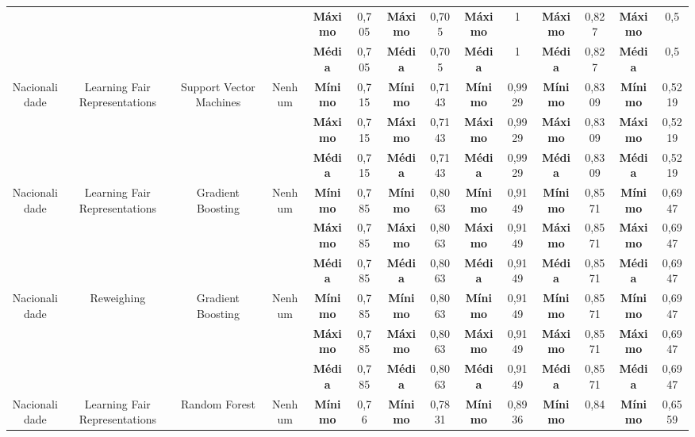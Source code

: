 \documentclass[portugues]{ic-tese}
\begin{document}
\begin{table}[H]
\begin{center}
{\begin{tabular}{c|c|c|c|c|c|c|c|c|c|c|c|c|c}
             & & & & \textbf{Máximo} & 0,705 & \textbf{Máximo} & 0,705 & \textbf{Máximo} & 1 & \textbf{Máximo} & 0,827 & \textbf{Máximo} & 0,5 \\
             & & & & \textbf{Média} & 0,705 & \textbf{Média} & 0,705 & \textbf{Média} & 1 & \textbf{Média} & 0,827 & \textbf{Média} & 0,5 \\
            \hline
            \multirow{3}{*}{Nacionalidade} & \multirow{3}{*}{Learning Fair Representations} & \multirow{3}{*}{Support Vector Machines} & \multirow{3}{*}{Nenhum} & \textbf{Mínimo} & 0,715 & \textbf{Mínimo} & 0,7143 & \textbf{Mínimo} & 0,9929 & \textbf{Mínimo} & 0,8309 & \textbf{Mínimo} & 0,5219 \\
             & & & & \textbf{Máximo} & 0,715 & \textbf{Máximo} & 0,7143 & \textbf{Máximo} & 0,9929 & \textbf{Máximo} & 0,8309 & \textbf{Máximo} & 0,5219 \\
             & & & & \textbf{Média} & 0,715 & \textbf{Média} & 0,7143 & \textbf{Média} & 0,9929 & \textbf{Média} & 0,8309 & \textbf{Média} & 0,5219 \\
            \hline
            \multirow{3}{*}{Nacionalidade} & \multirow{3}{*}{Learning Fair Representations} & \multirow{3}{*}{Gradient Boosting} & \multirow{3}{*}{Nenhum} & \textbf{Mínimo} & 0,785 & \textbf{Mínimo} & 0,8063 & \textbf{Mínimo} & 0,9149 & \textbf{Mínimo} & 0,8571 & \textbf{Mínimo} & 0,6947 \\
             & & & & \textbf{Máximo} & 0,785 & \textbf{Máximo} & 0,8063 & \textbf{Máximo} & 0,9149 & \textbf{Máximo} & 0,8571 & \textbf{Máximo} & 0,6947 \\
             & & & & \textbf{Média} & 0,785 & \textbf{Média} & 0,8063 & \textbf{Média} & 0,9149 & \textbf{Média} & 0,8571 & \textbf{Média} & 0,6947 \\
            \hline
            \multirow{3}{*}{Nacionalidade} & \multirow{3}{*}{Reweighing} & \multirow{3}{*}{Gradient Boosting} & \multirow{3}{*}{Nenhum} & \textbf{Mínimo} & 0,785 & \textbf{Mínimo} & 0,8063 & \textbf{Mínimo} & 0,9149 & \textbf{Mínimo} & 0,8571 & \textbf{Mínimo} & 0,6947 \\
             & & & & \textbf{Máximo} & 0,785 & \textbf{Máximo} & 0,8063 & \textbf{Máximo} & 0,9149 & \textbf{Máximo} & 0,8571 & \textbf{Máximo} & 0,6947 \\
             & & & & \textbf{Média} & 0,785 & \textbf{Média} & 0,8063 & \textbf{Média} & 0,9149 & \textbf{Média} & 0,8571 & \textbf{Média} & 0,6947 \\
            \hline
            \multirow{3}{*}{Nacionalidade} & \multirow{3}{*}{Learning Fair Representations} & \multirow{3}{*}{Random Forest} & \multirow{3}{*}{Nenhum} & \textbf{Mínimo} & 0,76 & \textbf{Mínimo} & 0,7831 & \textbf{Mínimo} & 0,8936 & \textbf{Mínimo} & 0,84 & \textbf{Mínimo} & 0,6559 \\

\end{tabular}}
\end{center}
\end{table}
\end{document}
